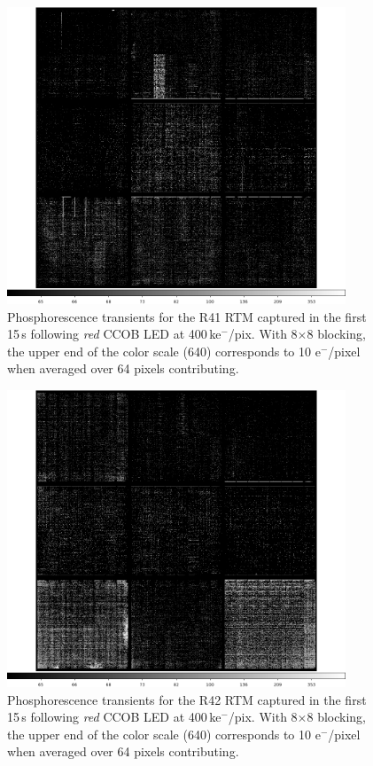 \begin{figure}[!htbp]
\centering
\includegraphics[width=0.9\textwidth]{sections/figures/phosphorescence-survey/itl_fluor_R41_0-19_rb1_log.png}
\caption{Phosphorescence transients for the R41 RTM captured in the first 15\,s following {\it red} CCOB LED at 400\,ke$^-$/pix. With 8$\times$8 blocking, the upper end of the color scale (640) corresponds to 10 e$^-$/pixel when averaged over 64 pixels contributing.}
\label{fig:phos:R41}
\end{figure}

\begin{figure}[!htbp]
\centering
\includegraphics[width=0.9\textwidth]{sections/figures/phosphorescence-survey/itl_fluor_R42_0-19_rb1_log.png}
\caption{Phosphorescence transients for the R42 RTM captured in the first 15\,s following {\it red} CCOB LED at 400\,ke$^-$/pix. With 8$\times$8 blocking, the upper end of the color scale (640) corresponds to 10 e$^-$/pixel when averaged over 64 pixels contributing.}
\label{fig:phos:R42}
\end{figure}

